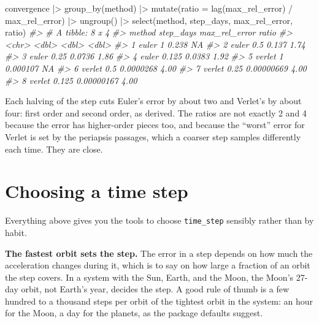 \documentclass[
  10.5pt,
  letterpaper,
]{scrbook}
\newenvironment{Shaded}{\begin{snugshade}}{\end{snugshade}}
\newcommand{\AttributeTok}[1]{\textcolor[rgb]{0.00,0.00,0.00}{#1}}
\newcommand{\CommentTok}[1]{\textcolor[rgb]{0.00,0.00,0.00}{\textit{#1}}}
\newcommand{\FunctionTok}[1]{\textcolor[rgb]{0.00,0.00,0.00}{#1}}
\newcommand{\NormalTok}[1]{\textcolor[rgb]{0.00,0.00,0.00}{#1}}
\newcommand{\SpecialCharTok}[1]{\textcolor[rgb]{0.00,0.00,0.00}{#1}}
\theoremstyle{plain}
\theoremstyle{remark}
\begin{document}
\begin{Shaded}
\begin{Highlighting}[]
\NormalTok{convergence }\SpecialCharTok{|\textgreater{}}
  \FunctionTok{group\_by}\NormalTok{(method) }\SpecialCharTok{|\textgreater{}}
  \FunctionTok{mutate}\NormalTok{(}\AttributeTok{ratio =} \FunctionTok{lag}\NormalTok{(max\_rel\_error) }\SpecialCharTok{/}\NormalTok{ max\_rel\_error) }\SpecialCharTok{|\textgreater{}}
  \FunctionTok{ungroup}\NormalTok{() }\SpecialCharTok{|\textgreater{}}
  \FunctionTok{select}\NormalTok{(method, step\_days, max\_rel\_error, ratio)}
\CommentTok{\#\textgreater{} \# A tibble: 8 x 4}
\CommentTok{\#\textgreater{}   method step\_days max\_rel\_error ratio}
\CommentTok{\#\textgreater{}   \textless{}chr\textgreater{}      \textless{}dbl\textgreater{}         \textless{}dbl\textgreater{} \textless{}dbl\textgreater{}}
\CommentTok{\#\textgreater{} 1 euler      1        0.238      NA   }
\CommentTok{\#\textgreater{} 2 euler      0.5      0.137       1.74}
\CommentTok{\#\textgreater{} 3 euler      0.25     0.0736      1.86}
\CommentTok{\#\textgreater{} 4 euler      0.125    0.0383      1.92}
\CommentTok{\#\textgreater{} 5 verlet     1        0.000107   NA   }
\CommentTok{\#\textgreater{} 6 verlet     0.5      0.0000268   4.00}
\CommentTok{\#\textgreater{} 7 verlet     0.25     0.00000669  4.00}
\CommentTok{\#\textgreater{} 8 verlet     0.125    0.00000167  4.00}
\end{Highlighting}
\end{Shaded}

Each halving of the step cuts Euler's error by about two and Verlet's by
about four: first order and second order, as derived. The ratios are not
exactly 2 and 4 because the error has higher-order pieces too, and
because the ``worst'' error for Verlet is set by the periapsis passages,
which a coarser step samples differently each time. They are close.

\section{Choosing a time step}\label{choosing-a-time-step}

Everything above gives you the tools to choose \texttt{time\_step}
sensibly rather than by habit.

\textbf{The fastest orbit sets the step.} The error in a step depends on
how much the acceleration changes during it, which is to say on how
large a fraction of an orbit the step covers. In a system with the Sun,
Earth, and the Moon, the Moon's 27-day orbit, not Earth's year, decides
the step. A good rule of thumb is a few hundred to a thousand steps per
orbit of the tightest orbit in the system: an hour for the Moon, a day
for the planets, as the package defaults suggest.
\end{document}
